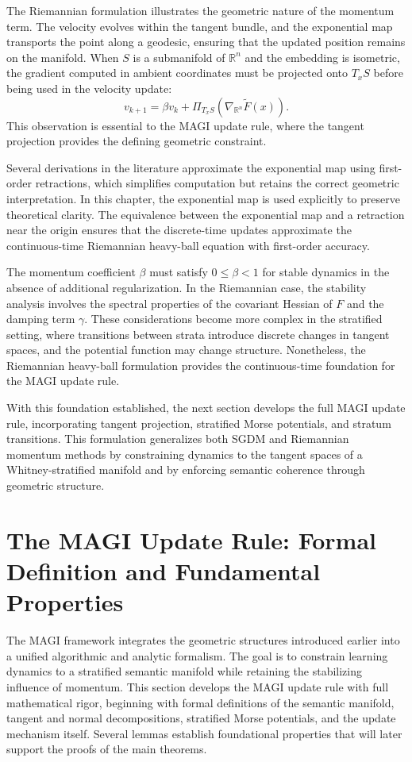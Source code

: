 \documentclass[12pt]{article}
\begin{document}
The Riemannian formulation illustrates the geometric nature of the momentum term. The velocity evolves within the tangent bundle, and the exponential map transports the point along a geodesic, ensuring that the updated position remains on the manifold. When $S$ is a submanifold of $\mathbb{R}^n$ and the embedding is isometric, the gradient computed in ambient coordinates must be projected onto $T_x S$ before being used in the velocity update:
\[
v_{k+1} = \beta v_k + \Pi_{T_x S}(\nabla_{\mathbb{R}^n} \widetilde{F}(x)).
\]
This observation is essential to the MAGI update rule, where the tangent projection provides the defining geometric constraint.

Several derivations in the literature approximate the exponential map using first-order retractions, which simplifies computation but retains the correct geometric interpretation. In this chapter, the exponential map is used explicitly to preserve theoretical clarity. The equivalence between the exponential map and a retraction near the origin ensures that the discrete-time updates approximate the continuous-time Riemannian heavy-ball equation with first-order accuracy.

The momentum coefficient $\beta$ must satisfy $0 \leq \beta < 1$ for stable dynamics in the absence of additional regularization. In the Riemannian case, the stability analysis involves the spectral properties of the covariant Hessian of $F$ and the damping term $\gamma$. These considerations become more complex in the stratified setting, where transitions between strata introduce discrete changes in tangent spaces, and the potential function may change structure. Nonetheless, the Riemannian heavy-ball formulation provides the continuous-time foundation for the MAGI update rule.

With this foundation established, the next section develops the full MAGI update rule, incorporating tangent projection, stratified Morse potentials, and stratum transitions. This formulation generalizes both SGDM and Riemannian momentum methods by constraining dynamics to the tangent spaces of a Whitney-stratified manifold and by enforcing semantic coherence through geometric structure.

\section{The MAGI Update Rule: Formal Definition and Fundamental Properties}

The MAGI framework integrates the geometric structures introduced earlier into a unified algorithmic and analytic formalism. The goal is to constrain learning dynamics to a stratified semantic manifold while retaining the stabilizing influence of momentum. This section develops the MAGI update rule with full mathematical rigor, beginning with formal definitions of the semantic manifold, tangent and normal decompositions, stratified Morse potentials, and the update mechanism itself. Several lemmas establish foundational properties that will later support the proofs of the main theorems.
\end{document}
